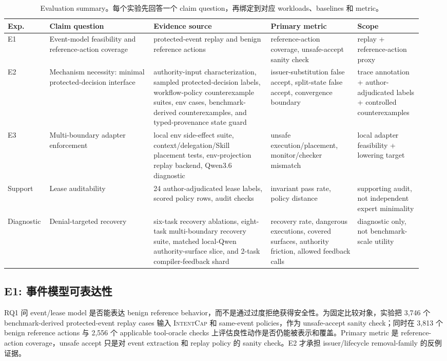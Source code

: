 \documentclass[UTF8,a4paper,11pt]{ctexart}
\newcommand{\sys}{\textsc{IntentCap}\xspace}
\begin{document}
\begin{table}[t]
\centering
\scriptsize
\setlength{\tabcolsep}{2pt}
\caption{Evaluation summary。每个实验先回答一个 claim question，再绑定到对应 workloads、baselines 和 metric。}
\label{tab:evaluation-summary}
\begin{tabular}{p{0.08\linewidth}p{0.24\linewidth}p{0.27\linewidth}p{0.20\linewidth}p{0.15\linewidth}}
\toprule
Exp. & Claim question & Evidence source & Primary metric & Scope \\
\midrule
E1 & Event-model feasibility and reference-action coverage & protected-event replay and benign reference actions & reference-action coverage, unsafe-accept sanity check & replay + reference-action proxy \\
E2 & Mechanism necessity: minimal protected-decision interface & authority-input characterization, sampled protected-decision labels, workflow-policy counterexample suites, env cases, benchmark-derived counterexamples, and typed-provenance state guard & issuer-substitution false accept, split-state false accept, convergence boundary & trace annotation + author-adjudicated labels + controlled counterexamples \\
E3 & Multi-boundary adapter enforcement & local env side-effect suite, context/delegation/Skill placement tests, env-projection replay backend, Qwen3.6 diagnostic & unsafe execution/placement, monitor/checker mismatch & local adapter feasibility + lowering target \\
Support & Lease auditability & 24 author-adjudicated lease labels, scored policy rows, audit checks & invariant pass rate, policy distance & supporting audit, not independent expert minimality \\
Diagnostic & Denial-targeted recovery & six-task recovery ablations, eight-task multi-boundary recovery suite, matched local-Qwen authority-surface slice, and 2-task compiler-feedback shard & recovery rate, dangerous executions, covered surfaces, authority friction, allowed feedback calls & diagnostic only, not benchmark-scale utility \\
\bottomrule
\end{tabular}
\end{table}

\subsection{E1: 事件模型可表达性}

RQ1 问 event/lease model 是否能表达 benign reference behavior，而不是通过过度拒绝获得安全性。为固定比较对象，实验把 3,746 个 benchmark-derived protected-event replay cases 输入 \sys 和 same-event policies，作为 unsafe-accept sanity check；同时在 3,813 个 benign reference actions 与 2,556 个 applicable tool-oracle checks 上评估良性动作是否仍能被表示和覆盖。Primary metric 是 reference-action coverage，unsafe accept 只是对 event extraction 和 replay policy 的 sanity check。E2 才承担 issuer/lifecycle removal-family 的反例证据。
\end{document}
